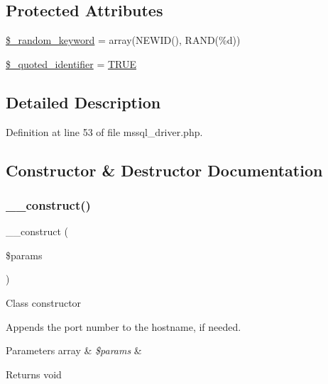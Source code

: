 \subsection*{Protected Attributes}
\begin{DoxyCompactItemize}
\item 
\mbox{\hyperlink{class_c_i___d_b__mssql__driver_a10213aa6e05f6d924d3277bb1d2fea00}{\$\+\_\+random\+\_\+keyword}} = array(\textquotesingle{}N\+E\+W\+ID()\textquotesingle{}, \textquotesingle{}R\+A\+ND(\%d)\textquotesingle{})
\item 
\mbox{\hyperlink{class_c_i___d_b__mssql__driver_a1dae2f0e9ad7299438a9976d6cdbf2ad}{\$\+\_\+quoted\+\_\+identifier}} = \mbox{\hyperlink{constants_8php_ae04a3efe6aa42044f803ee90c2277846}{T\+R\+UE}}
\end{DoxyCompactItemize}


\subsection{Detailed Description}


Definition at line 53 of file mssql\+\_\+driver.\+php.



\subsection{Constructor \& Destructor Documentation}
\mbox{\label{class_c_i___d_b__mssql__driver_a9162320adff1a1a4afd7f2372f753a3e}} 
\subsubsection{\texorpdfstring{\_\_construct()}{\_\_construct()}}
{\footnotesize\ttfamily \+\_\+\+\_\+construct (\begin{DoxyParamCaption}\item[{}]{\$params }\end{DoxyParamCaption})}

Class constructor

Appends the port number to the hostname, if needed.


\begin{DoxyParams}[1]{Parameters}
array & {\em \$params} & \\
\hline
\end{DoxyParams}
\begin{DoxyReturn}{Returns}
void 
\end{DoxyReturn}



